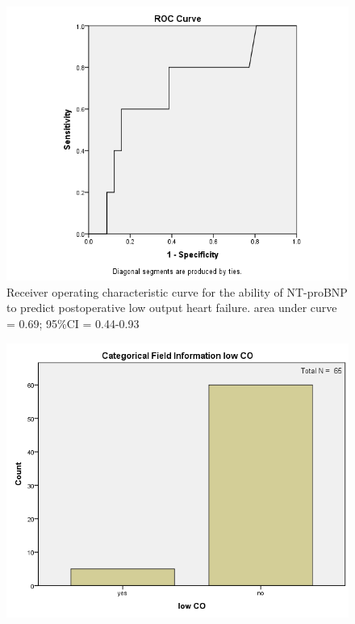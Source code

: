 \documentclass[14pt,a4paper,onecolumn]{extarticle}
\begin{document}
\clearpage
\begin{figure}
    \centering
    \includegraphics[scale=0.7]{./images/roc_low_co.png}
    \caption{Receiver operating characteristic curve for the ability of NT-proBNP to predict postoperative low output heart failure. area under curve = 0.69; 95\%CI = 0.44-0.93}
    \label{}
\end{figure}

\clearpage
\begin{figure}
    \centering
    \includegraphics[scale=0.7]{./images/cat_low_co.png}
    \caption{}
    \label{}
\end{figure}
\end{document}
